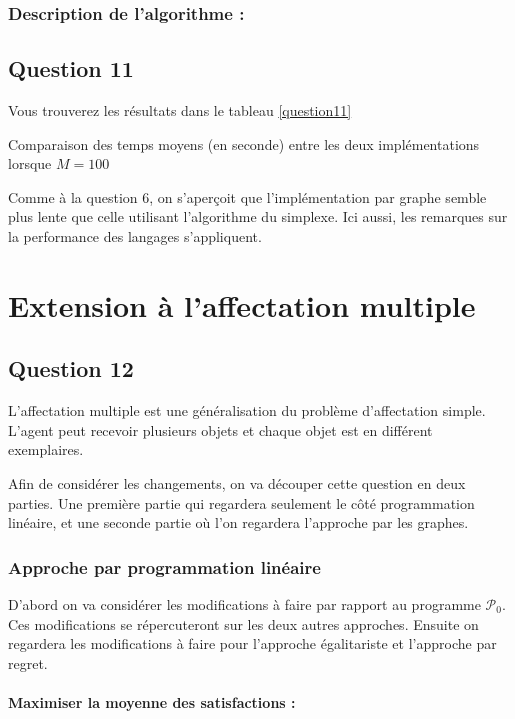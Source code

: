 \documentclass[a4paper, titlepage, oneside, 12pt]{article}%
\begin{document}
\subsubsection{Description de l'algorithme :}


\subsection{Question 11}
Vous trouverez les résultats dans le tableau \ref{question11}
\begin{table}[h]
\centerline{
}
\caption{Comparaison des temps moyens (en seconde) entre les deux implémentations lorsque $M=100$}
\label{question11}

\end{table}

Comme à la question $6$, on s'aperçoit que l'implémentation par graphe semble plus lente que celle utilisant l'algorithme du simplexe. Ici aussi, les remarques sur la performance des langages s'appliquent.
\section{Extension à l'affectation multiple}

\subsection{Question 12}

L'affectation multiple est une généralisation du problème d'affectation simple. L'agent peut recevoir plusieurs objets et chaque objet est en différent exemplaires.

Afin de considérer les changements, on va découper cette question en deux parties. Une première partie qui regardera seulement le côté programmation linéaire, et une seconde partie où l'on regardera l'approche par les graphes.

\subsubsection{Approche par programmation linéaire}

D'abord on va considérer les modifications à faire par rapport au programme $\mathcal{P}_0$. Ces modifications se répercuteront sur les deux autres approches. Ensuite on regardera les modifications à faire pour l'approche égalitariste et l'approche par regret.

\paragraph{Maximiser la moyenne des satisfactions : }
\end{document}
